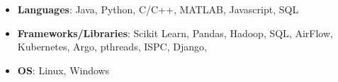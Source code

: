 \documentclass[letterpaper,10pt]{article}
\makeatletter
\newcommand{\resumeItem}[2]{
  \item\small{
    \textbf{#1}{: #2 \vspace{-2pt}}
  }
}
\newcommand{\resumeSubheading}[4]{
  \vspace{-1pt}\item
    \begin{tabular*}{0.97\textwidth}{l@{\extracolsep{\fill}}r}
      \textbf{#1} & #2 \\
      \textit{\small#3} & \textit{\small #4} \\
    \end{tabular*}\vspace{-5pt}
}
\newcommand{\resumeSubHeadingListStart}{\begin{itemize}[leftmargin=*]}
\newcommand{\resumeItemListStart}{\begin{itemize}}
\newcommand{\resumeItemListEnd}{\end{itemize}\vspace{-5pt}}
\makeatother
\begin{document}
\resumeItemListStart
\resumeItem{Languages}{Java, Python, C/C++, MATLAB, Javascript,  SQL}
\resumeItem{Frameworks/Libraries}{Scikit Learn, Pandas, Hadoop, SQL, AirFlow, Kubernetes, Argo, pthreads, ISPC, Django, }
\resumeItem{OS}{Linux, Windows}
\resumeItemListEnd


\end{document}
